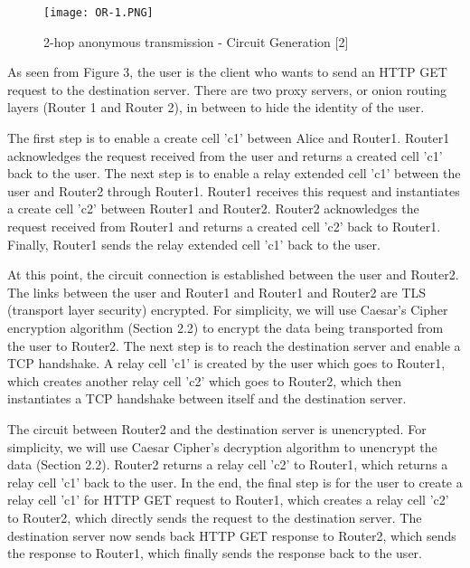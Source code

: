 \documentclass{article}
\begin{document}
\begin{figure}[!ht]
	\label{fig:iv}
    \centering
    \texttt{[image: OR-1.PNG]}
    \caption{2-hop anonymous transmission - Circuit Generation [2]}
\end{figure}

\vspace{0.3 cm}

\noindent As seen from Figure 3, the user is the client who wants to send an HTTP GET request to the destination server. There are two proxy servers, or onion routing layers (Router 1 and Router 2), in between to hide the identity of the user.\\

\vspace{0.3 cm}

\noindent The first step is to enable a create cell 'c1' between Alice and Router1. Router1 acknowledges the request received from the user and returns a created cell 'c1' back to the user. The next step is to enable a relay extended cell 'c1' between the user and Router2 through Router1. Router1 receives this request and instantiates a create cell 'c2' between Router1 and Router2. Router2 acknowledges the request received from Router1 and returns a created cell 'c2' back to Router1. Finally, Router1 sends the relay extended cell 'c1' back to the user. \\

\vspace{0.3 cm}

\noindent At this point, the circuit connection is established between the user and Router2. The links between the user and Router1 and Router1 and Router2 are TLS (transport layer security) encrypted. For simplicity, we will use Caesar’s Cipher encryption algorithm (Section 2.2) to encrypt the data being transported from the user to Router2. 
The next step is to reach the destination server and enable a TCP handshake. A relay cell 'c1' is created by the user which goes to Router1, which creates another relay cell 'c2' which goes to Router2,  which then instantiates a TCP handshake between itself and the destination server. \\

\vspace{0.3 cm}

\noindent The circuit between Router2 and the destination server is unencrypted. For simplicity, we will use Caesar Cipher’s decryption algorithm to unencrypt the data (Section 2.2). Router2 returns a relay cell 'c2' to Router1, which returns a relay cell 'c1' back to the user. In the end, the final step is for the user to create a relay cell 'c1' for HTTP GET request to Router1, which creates a relay cell 'c2' to Router2, which directly sends the request to the destination server. The destination server now sends back HTTP GET response to Router2, which sends the response to Router1, which finally sends the response back to the user. 
\end{document}
